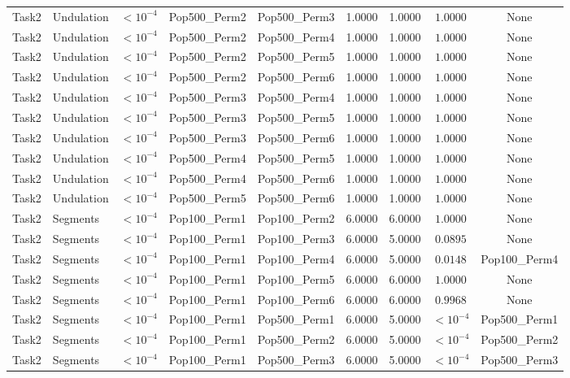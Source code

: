 \documentclass[8pt]{article}
\begin{document}
\begin{longtable}{llccccccc}
Task2 & Undulation & $< 10^{-4}$ & Pop500\_Perm2 & Pop500\_Perm3 & 1.0000 & 1.0000 & $1.0000$ & None \\
Task2 & Undulation & $< 10^{-4}$ & Pop500\_Perm2 & Pop500\_Perm4 & 1.0000 & 1.0000 & $1.0000$ & None \\
Task2 & Undulation & $< 10^{-4}$ & Pop500\_Perm2 & Pop500\_Perm5 & 1.0000 & 1.0000 & $1.0000$ & None \\
Task2 & Undulation & $< 10^{-4}$ & Pop500\_Perm2 & Pop500\_Perm6 & 1.0000 & 1.0000 & $1.0000$ & None \\
Task2 & Undulation & $< 10^{-4}$ & Pop500\_Perm3 & Pop500\_Perm4 & 1.0000 & 1.0000 & $1.0000$ & None \\
Task2 & Undulation & $< 10^{-4}$ & Pop500\_Perm3 & Pop500\_Perm5 & 1.0000 & 1.0000 & $1.0000$ & None \\
Task2 & Undulation & $< 10^{-4}$ & Pop500\_Perm3 & Pop500\_Perm6 & 1.0000 & 1.0000 & $1.0000$ & None \\
Task2 & Undulation & $< 10^{-4}$ & Pop500\_Perm4 & Pop500\_Perm5 & 1.0000 & 1.0000 & $1.0000$ & None \\
Task2 & Undulation & $< 10^{-4}$ & Pop500\_Perm4 & Pop500\_Perm6 & 1.0000 & 1.0000 & $1.0000$ & None \\
Task2 & Undulation & $< 10^{-4}$ & Pop500\_Perm5 & Pop500\_Perm6 & 1.0000 & 1.0000 & $1.0000$ & None \\
Task2 & Segments & $< 10^{-4}$ & Pop100\_Perm1 & Pop100\_Perm2 & 6.0000 & 6.0000 & $1.0000$ & None \\
Task2 & Segments & $< 10^{-4}$ & Pop100\_Perm1 & Pop100\_Perm3 & 6.0000 & 5.0000 & $0.0895$ & None \\
Task2 & Segments & $< 10^{-4}$ & Pop100\_Perm1 & Pop100\_Perm4 & 6.0000 & 5.0000 & $0.0148$ & Pop100\_Perm4 \\
Task2 & Segments & $< 10^{-4}$ & Pop100\_Perm1 & Pop100\_Perm5 & 6.0000 & 6.0000 & $1.0000$ & None \\
Task2 & Segments & $< 10^{-4}$ & Pop100\_Perm1 & Pop100\_Perm6 & 6.0000 & 6.0000 & $0.9968$ & None \\
Task2 & Segments & $< 10^{-4}$ & Pop100\_Perm1 & Pop500\_Perm1 & 6.0000 & 5.0000 & $< 10^{-4}$ & Pop500\_Perm1 \\
Task2 & Segments & $< 10^{-4}$ & Pop100\_Perm1 & Pop500\_Perm2 & 6.0000 & 5.0000 & $< 10^{-4}$ & Pop500\_Perm2 \\
Task2 & Segments & $< 10^{-4}$ & Pop100\_Perm1 & Pop500\_Perm3 & 6.0000 & 5.0000 & $< 10^{-4}$ & Pop500\_Perm3 \\

\end{longtable}
\end{document}
